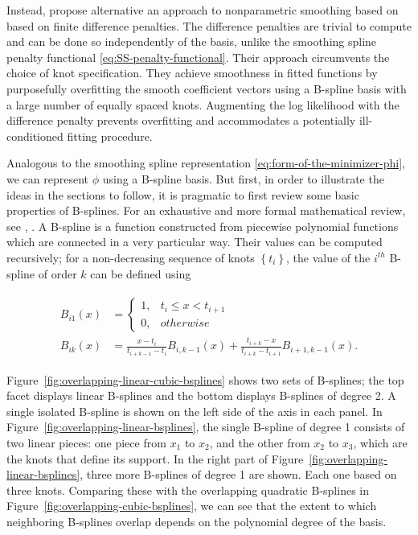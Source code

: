 \bigskip

Instead, \cite{eilers1996flexible} propose alternative an approach to nonparametric smoothing based on based on finite difference penalties. The difference penalties are trivial to compute and can be done so independently of the basis, unlike the smoothing spline penalty functional \eqref{eq:SS-penalty-functional}. Their approach circumvents the choice of knot specification. They achieve smoothness in fitted functions by purposefully overfitting the smooth coefficient vectors using a B-spline basis with a large number of equally spaced knots.  Augmenting the log likelihood with the difference penalty prevents overfitting and accommodates a potentially ill-conditioned fitting procedure. 

\bigskip

Analogous to the smoothing spline representation \eqref{eq:form-of-the-minimizer-phi}, we can represent $\phi$ using a B-spline basis. But first, in order to illustrate the ideas in the sections to follow, it is pragmatic to first review some basic properties of B-splines. For an exhaustive and more formal mathematical review, see  \cite{de1978practical}, \cite{dierckx1995curve}. A B-spline is a function constructed from piecewise polynomial functions which are connected in a very particular way. Their values can be computed recursively; for a non-decreasing sequence of knots $\left\{t_i\right\}$, the value of the $i^{th}$ B-spline of order $k$ can be defined using

\begin{align} 
\begin{split} \label{eq:bspline-recursive-relation}
B_{i1}\left(x\right) &= \left\{ \begin{array}{ll}
1, & t_i \le x < t_{i+1}\\
0, & otherwise
\end{array} \right.
\\
B_{ik}\left(x\right) &= \frac{x-t_i}{t_{i+k-1}-t_i}B_{i,k-1}\left(x\right) + \frac{t_{i+k}-x}{t_{i+k}-t_{i+1}}B_{i+1,k-1}\left(x\right). 
\end{split}
\end{align}

Figure~\ref{fig:overlapping-linear-cubic-bsplines} shows two sets of B-splines; the top facet displays linear B-splines and the bottom displays B-splines of degree 2. A single isolated B-spline is shown on the left side of the axis in each panel. In Figure~\ref{fig:overlapping-linear-bsplines}, the single B-spline of degree 1 consists of two linear pieces: one piece from $x_1$ to $x_2$, and the other from $x_2$ to $x_3$, which are the knots that define its support. In the right part of Figure~\ref{fig:overlapping-linear-bsplines}, three more B-splines of degree 1 are shown. Each one based on three knots. Comparing these with the overlapping quadratic B-splines in Figure~\ref{fig:overlapping-cubic-bsplines}, we can see that the extent to which neighboring B-splines overlap depends on the polynomial degree of the basis. 

